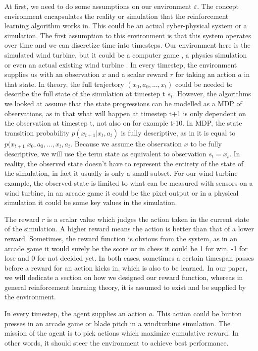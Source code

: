 \documentclass[hyperref,german,beleg]{cgvpub}
\begin{document}
At first, we need to do some assumptions on our environment $\varepsilon$. The concept environment encapsulates the reality or simulation that the reinforcement learning algorithm works in. This could be an actual cyber-physical system or a simulation. The first assumption to this environment is that this system operates over time and we can discretize time into timesteps. Our environment here is the simulated wind turbine, but it could be a computer game \cite{lillicrapCONTINUOUSCONTROLDEEP2015}, a physics simulation\cite{brockmanOpenAIGym2016} or even an actual existing wind turbine \cite{kolterDesignAnalysisLearning2012}. 
In every timestep, the environment supplies us with an observation \(x\) and a scalar reward \(r\) for taking an action \(a\) in that state. In theory, the full trajectory \((x_0, a_0, ..., x_t)\) could be needed to describe the full state of the simulation at timestep t \(s_t\). However, the algorithms we looked at assume that the state progressions can be modelled as a \ac{MDP} of observations, as in that what will happen at timestep t+1 is only dependent on the observation at timestep t, not also on for example t-10. In \ac{MDP}, the state transition probability \(p(x_{t+1}|x_t, a_t)\) is fully descriptive, as in it is equal to \(p(x_{t+1}|x_0, a_0, ..., x_t, a_t\). Because we assume the observation \(x\) to be fully descriptive, we will use the term state as equivalent to observation \(s_t = x_t\). In reality, the observed state doesn't have to represent the entirety of the state of the simulation, in fact it usually is only a small subset. For our wind turbine example, the observed state is limited to what can be measured with sensors on a wind turbine, in an arcade game it could be the pixel output or in a physical simulation it could be some key values in the simulation.

The reward \(r\) is a scalar value which judges the action taken in the current state of the simulation. A higher reward means the action is better than that of a lower reward. Sometimes, the reward function is obvious from the system, as in an arcade game it would surely be the score or in chess it could be 1 for win, -1 for lose and 0 for not decided yet. In both cases, sometimes a certain timespan passes before a reward for an action kicks in, which is also to be learned. In our paper, we will dedicate a section on how we designed our reward function, whereas in general reinforcement learning theory, it is assumed to exist and be supplied by the environment.

In every timestep, the agent supplies an action \(a\). This action could be button presses in an arcade game or blade pitch in a windturbine simulation. The mission of the agent is to pick actions which maximize cumulative reward. In other words, it should steer the environment to achieve best performance.
\end{document}
